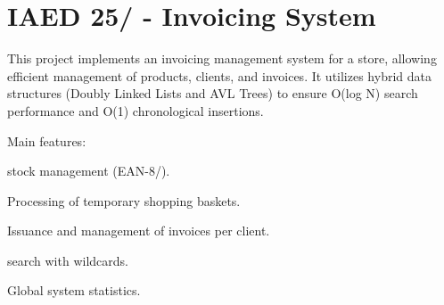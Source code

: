 \chapter{IAED 25/ -\/ Invoicing System }
\hypertarget{index}{}\label{index}
This project implements an invoicing management system for a store, allowing efficient management of products, clients, and invoices. It utilizes hybrid data structures (Doubly Linked Lists and AVL Trees) to ensure O(log N) search performance and O(1) chronological insertions.

Main features:\+
\begin{DoxyItemize}
\item {} stock management (EAN-\/8/).
\item Processing of temporary shopping baskets.
\item Issuance and management of invoices per client.
\item {} search with wildcards.
\item Global system statistics. 
\end{DoxyItemize}